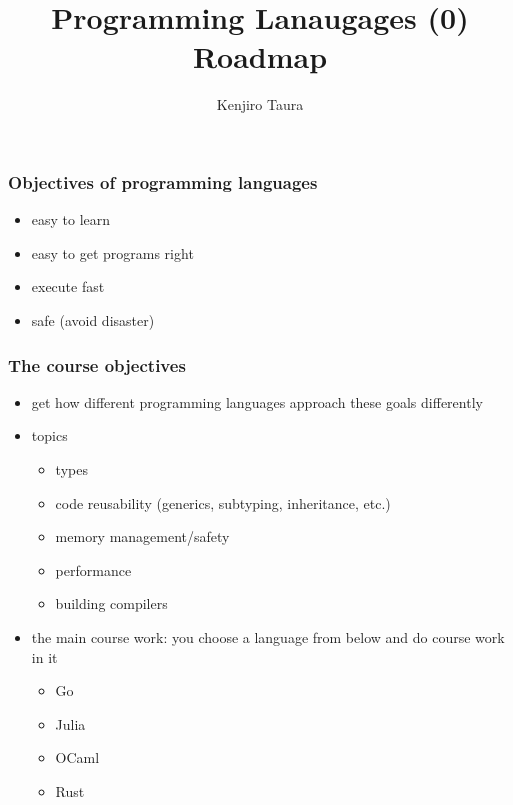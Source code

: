 \documentclass[12pt,dvipdfmx]{beamer}
\title{Programming Lanaugages (0) \\
Roadmap}
\institute{}
\author{Kenjiro Taura}
\date{}
\newcommand{\ao}[1]{{\color{blue}#1}}
\begin{document}
\maketitle


\begin{frame}
  \frametitle{Objectives of programming languages}
  \begin{itemize}
  \item easy to learn
  \item easy to get programs right
  \item execute fast
  \item safe (avoid disaster)
  \end{itemize}
\end{frame}

\begin{frame}
  \frametitle{The course objectives}
  \begin{itemize}
  \item get how different programming languages approach
    these goals differently
  \item topics
    \begin{itemize}
    \item types
    \item code reusability
      (generics, subtyping, inheritance, etc.)
    \item memory management/safety
    \item performance
    \item building compilers
    \end{itemize}

  \item the main course work: you choose a language from below
    and do course work in it
    \begin{itemize}
    \item \ao{Go}
    \item \ao{Julia}
    \item \ao{OCaml}
    \item \ao{Rust}
    \end{itemize}
  \end{itemize}
\end{frame}
\end{document}
